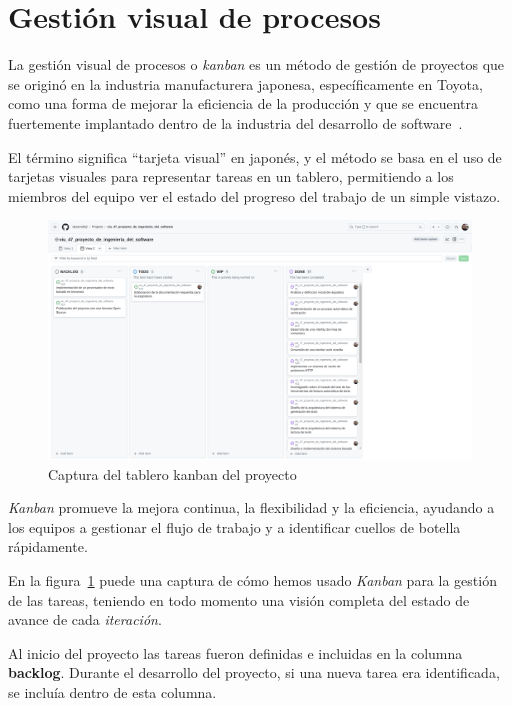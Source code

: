 \section{Gestión visual de procesos}

La gestión visual de procesos o \textit{kanban} es un método de gestión de proyectos que se originó en la industria
manufacturera japonesa, específicamente en Toyota, como una forma de mejorar la eficiencia de la producción y que se
encuentra fuertemente implantado dentro de la industria del desarrollo de software~\cite{book_anderson_2010}.

El término significa ``tarjeta visual'' en japonés, y el método se basa en el uso de tarjetas visuales para
representar tareas en un tablero, permitiendo a los miembros del equipo ver el estado del progreso del trabajo de un
simple vistazo.

\begin{figure}[ht]
    \begin{center}
        \includegraphics[width=\textwidth]{./chapter/3/images/chapter_3.kanban}
        \caption{Captura del tablero kanban del proyecto}
        \label{fig:chapter_3.kanban}
    \end{center}
\end{figure}

\textit{Kanban} promueve la mejora continua, la flexibilidad y la eficiencia, ayudando a los equipos a gestionar el
flujo de trabajo y a identificar cuellos de botella rápidamente.

En la figura~\ref{fig:chapter_3.kanban} puede una captura de cómo hemos usado \textit{Kanban} para la gestión de las
tareas, teniendo en todo momento una visión completa del estado de avance de cada \textit{iteración}.

Al inicio del proyecto las tareas fueron definidas e incluidas en la columna \textbf{backlog}.
Durante el desarrollo del proyecto, si una nueva tarea era identificada, se incluía dentro de esta columna.

